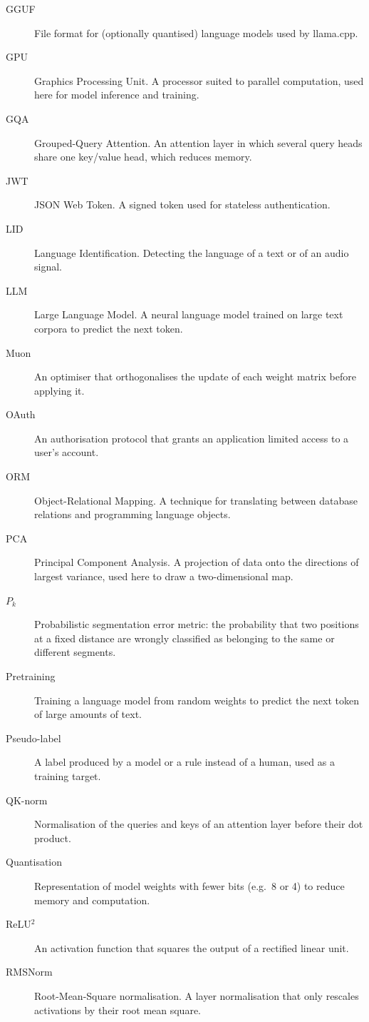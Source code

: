 \documentclass[ENG]{TFUOC}
\begin{document}
\begin{description}
\item[GGUF] File format for (optionally quantised) language models used by llama.cpp.
\item[GPU] Graphics Processing Unit. A processor suited to parallel computation, used here for model inference and training.
\item[GQA] Grouped-Query Attention. An attention layer in which several query heads share one key/value head, which reduces memory.
\item[JWT] JSON Web Token. A signed token used for stateless authentication.
\item[LID] Language Identification. Detecting the language of a text or of an audio signal.
\item[LLM] Large Language Model. A neural language model trained on large text corpora to predict the next token.
\item[Muon] An optimiser that orthogonalises the update of each weight matrix before applying it.
\item[OAuth] An authorisation protocol that grants an application limited access to a user's account.
\item[ORM] Object-Relational Mapping. A technique for translating between database relations and programming language objects.
\item[PCA] Principal Component Analysis. A projection of data onto the directions of largest variance, used here to draw a two-dimensional map.
\item[$P_k$] Probabilistic segmentation error metric: the probability that two positions at a fixed distance are wrongly classified as belonging to the same or different segments.
\item[Pretraining] Training a language model from random weights to predict the next token of large amounts of text.
\item[Pseudo-label] A label produced by a model or a rule instead of a human, used as a training target.
\item[QK-norm] Normalisation of the queries and keys of an attention layer before their dot product.
\item[Quantisation] Representation of model weights with fewer bits (e.g.\ 8 or 4) to reduce memory and computation.
\item[ReLU$^2$] An activation function that squares the output of a rectified linear unit.
\item[RMSNorm] Root-Mean-Square normalisation. A layer normalisation that only rescales activations by their root mean square.

\end{description}
\end{document}
